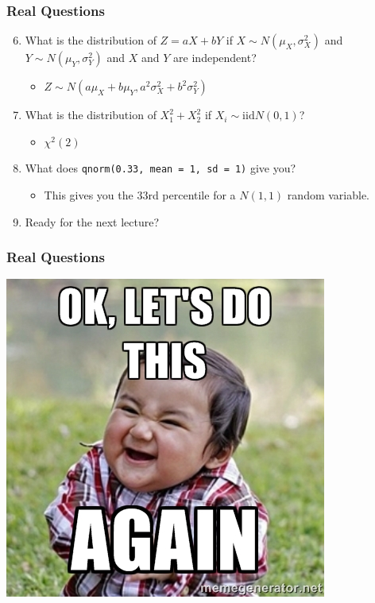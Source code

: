 \documentclass{beamer}
\begin{document}
\begin{frame}
\frametitle{Real Questions}
    \begin{enumerate}[<+- | alert@+>]
    \setcounter{enumi}{5}
        \item What is the distribution of $Z = aX + bY$ if $X \sim N(\mu_X, \sigma_X^2)$ and $Y \sim N(\mu_Y, \sigma_Y^2)$ and $X$ and $Y$ are independent?
        	\begin{itemize}
        		\item $Z \sim N(a \mu_X + b \mu_Y, a^2 \sigma_X^2 + b^2 \sigma_Y^2)$
        	\end{itemize}
    \item What is the distribution of $X_1^2 + X_2^2$ if $X_i \sim \text{iid} N(0, 1)$? 
    	\begin{itemize}
    		\item $\chi^2(2)$
    	\end{itemize}
    \item What does \texttt{qnorm(0.33, mean = 1, sd = 1)} give you?
    \begin{itemize}
    	\item This gives you the 33rd percentile for a $N(1, 1)$ random variable.
    \end{itemize}
     \item Ready for the next lecture?	
    \end{enumerate}
\end{frame} 

\begin{frame}
\frametitle{Real Questions}
    \centering
	   \includegraphics[scale = 0.5]{letsDoThis5.jpg}
\end{frame} 
\end{document}
